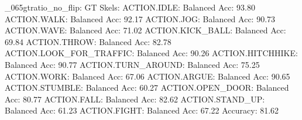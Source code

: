 _065gtratio_no_flip:
GT Skels:
ACTION.IDLE: Balanced Acc: 93.80%
ACTION.WALK: Balanced Acc: 92.17%
ACTION.JOG: Balanced Acc: 90.73%
ACTION.WAVE: Balanced Acc: 71.02%
ACTION.KICK_BALL: Balanced Acc: 69.84%
ACTION.THROW: Balanced Acc: 82.78%
ACTION.LOOK_FOR_TRAFFIC: Balanced Acc: 90.26%
ACTION.HITCHHIKE: Balanced Acc: 90.77%
ACTION.TURN_AROUND: Balanced Acc: 75.25%
ACTION.WORK: Balanced Acc: 67.06%
ACTION.ARGUE: Balanced Acc: 90.65%
ACTION.STUMBLE: Balanced Acc: 60.27%
ACTION.OPEN_DOOR: Balanced Acc: 80.77%
ACTION.FALL: Balanced Acc: 82.62%
ACTION.STAND_UP: Balanced Acc: 61.23%
ACTION.FIGHT: Balanced Acc: 67.22%
Accuracy: 81.62%

